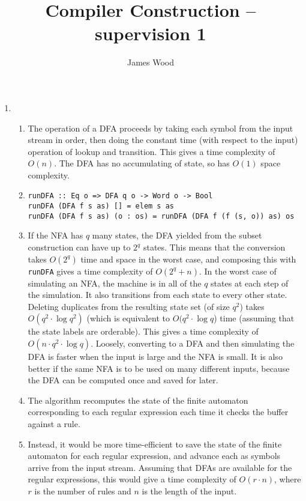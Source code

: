 \documentclass{article}
\begin{document}
\title{Compiler Construction -- supervision 1}
\author{James Wood}
\maketitle

\begin{enumerate}
  \item
    \begin{enumerate}
      \item The operation of a DFA proceeds by taking each symbol from the input stream in order, then doing the constant time (with respect to the input) operation of lookup and transition. This gives a time complexity of $O(n)$. The DFA has no accumulating of state, so has $O(1)$ space complexity.
      \item
        \begin{lstlisting}
runDFA :: Eq o => DFA q o -> Word o -> Bool
runDFA (DFA f s as) [] = elem s as
runDFA (DFA f s as) (o : os) = runDFA (DFA f (f (s, o)) as) os
        \end{lstlisting}
      \item
        If the NFA has $q$ many states, the DFA yielded from the subset construction can have up to $2^q$ states. This means that the conversion takes $O(2^q)$ time and space in the worst case, and composing this with \texttt{runDFA} gives a time complexity of $O(2^q + n)$.
        In the worst case of simulating an NFA, the machine is in all of the $q$ states at each step of the simulation. It also transitions from each state to every other state. Deleting duplicates from the resulting state set (of size $q^2$) takes $O(q^2 \cdot \log q^2)$ (which is equivalent to $O(q^2 \cdot \log q$) time (assuming that the state labels are orderable). This gives a time complexity of $O(n \cdot q^2 \cdot \log q)$.
        Loosely, converting to a DFA and then simulating the DFA is faster when the input is large and the NFA is small. It is also better if the same NFA is to be used on many different inputs, because the DFA can be computed once and saved for later.
      \item The algorithm recomputes the state of the finite automaton corresponding to each regular expression each time it checks the buffer against a rule.
      \item Instead, it would be more time-efficient to save the state of the finite automaton for each regular expression, and advance each as symbols arrive from the input stream. Assuming that DFAs are available for the regular expressions, this would give a time complexity of $O(r \cdot n)$, where $r$ is the number of rules and $n$ is the length of the input.

\end{enumerate}
\end{enumerate}
\end{document}
